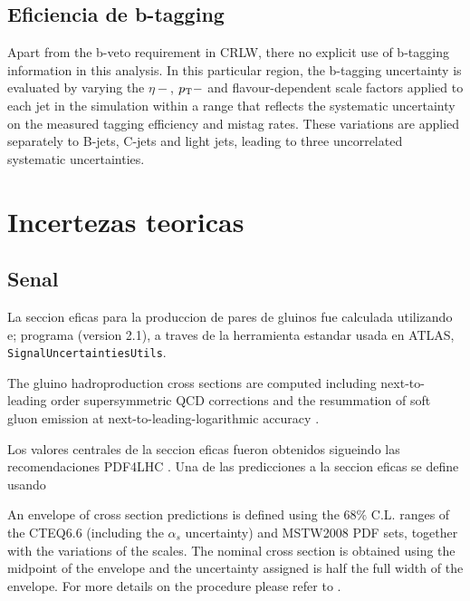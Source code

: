 \subsection{Eficiencia de b-tagging}
Apart from the b-veto requirement in CRLW, there no explicit use of b-tagging information in this analysis.
In this particular region, the b-tagging uncertainty is evaluated by varying the $\eta-$, $p_{\mathrm{T}}-$ and flavour-dependent
scale factors applied to each jet in the simulation within a range that reflects the systematic uncertainty
on the measured tagging efficiency and mistag rates. These variations are applied separately to B-jets,
C-jets and light jets, leading to three uncorrelated systematic uncertainties.

\section{Incertezas teoricas}\label{sec:theosyst}

\subsection{Senal}\label{sec:syst_signal}

La seccion eficas para la produccion de pares de gluinos  fue calculada utilizando
e; programa {\nllfast} (version 2.1)\cite{nllfast}, a traves de la herramienta
estandar usada en ATLAS, \texttt{SignalUncertaintiesUtils}.

The gluino hadroproduction cross sections are computed including
next-to-leading order supersymmetric QCD corrections and the resummation of soft gluon emission at next-to-leading-logarithmic accuracy
\cite{Beenakker:1996ch,Kulesza:2008jb,Kulesza:2009kq,Beenakker:2009ha,Beenakker:2011fu}.

Los valores centrales de la seccion eficas fueron obtenidos sigueindo las recomendaciones
PDF4LHC \cite{Botje:2011sn}.
Una  de las predicciones a la seccion eficas se define usando

An envelope of cross section predictions is defined using the $68\%$
C.L. ranges of the CTEQ6.6 \cite{Nadolsky:2008zw} (including the $\alpha_s$ uncertainty) and MSTW2008 \cite{Martin:2009iq} PDF sets, together with
the variations of the scales. The nominal cross section is obtained using the midpoint of the envelope and the
uncertainty assigned is half the full width of the envelope. For more details on the procedure please refer to \cite{Kramer:2012bx}.

